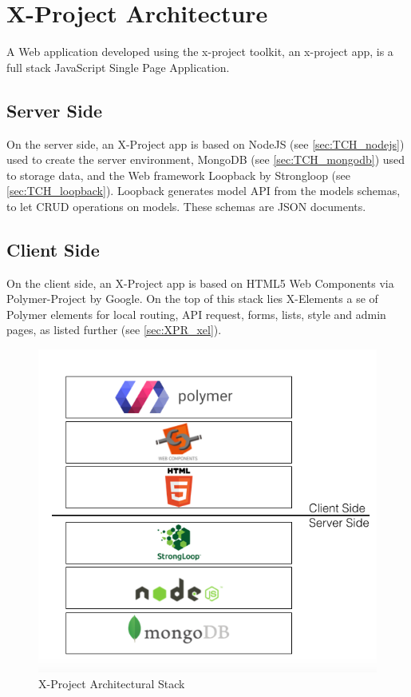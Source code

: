 \section{X-Project Architecture}
\label{sec:XPR_arc}

A Web application developed using the x-project toolkit, an x-project app, is a full stack JavaScript Single Page Application.

\subsection{Server Side}
\label{subsec:XPR_arc_serv}

On the server side, an X-Project app is based on NodeJS (see \ref{sec:TCH_nodejs}) used to create the server environment, MongoDB (see \ref{sec:TCH_mongodb}) used to storage data, and the Web framework Loopback by Strongloop (see \ref{sec:TCH_loopback}).
Loopback generates model API from the models schemas, to let CRUD operations on models. These schemas are JSON documents.


\subsection{Client Side}
\label{subsec:XPR_arc_clie}

On the client side, an X-Project app is based on HTML5 Web Components via Polymer-Project by Google.
On the top of this stack lies X-Elements a se of Polymer elements for local routing, API request, forms, lists, style and admin pages, as listed further (see \ref{sec:XPR_xel}).


\begin {figure}[h]
\graphicspath{{images/chapter_xpr/}}
\includegraphics[width=\textwidth]{XPR_stack}
\caption{X-Project Architectural Stack }
\end {figure}